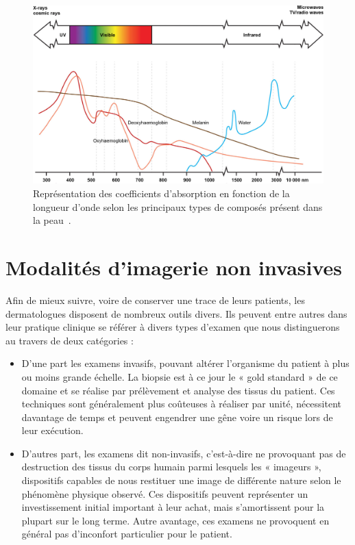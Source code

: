 \begin{figure}[H]
    \centering
    \includegraphics[width=\linewidth]{contents/chapter_2/resources/scheme_light_absorption.png}
    \caption{Représentation des coefficients d'absorption en fonction de la longueur d'onde selon les principaux types de composés présent dans la peau~\cite{Stewart2013}.}
    \label{fig:scheme_light_absorption}
\end{figure}
 
\clearpage
\section{Modalités d’imagerie non invasives}
Afin de mieux suivre, voire de conserver une trace de leurs patients, les dermatologues disposent de nombreux outils divers. Ils peuvent entre autres dans leur pratique clinique se référer à divers types d’examen que nous distinguerons au travers de deux catégories :
\begin{itemize}
\item D’une part les examens invasifs, pouvant altérer l’organisme du patient à plus ou moins grande échelle. La biopsie est à ce jour le « gold standard » de ce domaine et se réalise par prélèvement et analyse des tissus du patient. Ces techniques sont généralement plus coûteuses à réaliser par unité, nécessitent davantage de temps et peuvent engendrer une gêne voire un risque lors de leur exécution.
\item D’autres part, les examens dit non-invasifs, c’est-à-dire ne provoquant pas de destruction des tissus du corps humain parmi lesquels les « imageurs », dispositifs capables de nous restituer une image de différente nature selon le phénomène physique observé. Ces dispositifs peuvent représenter un investissement initial important à leur achat, mais s'amortissent pour la plupart sur le long terme. Autre avantage, ces examens ne provoquent en général pas d’inconfort particulier pour le patient.
\end{itemize}\par

